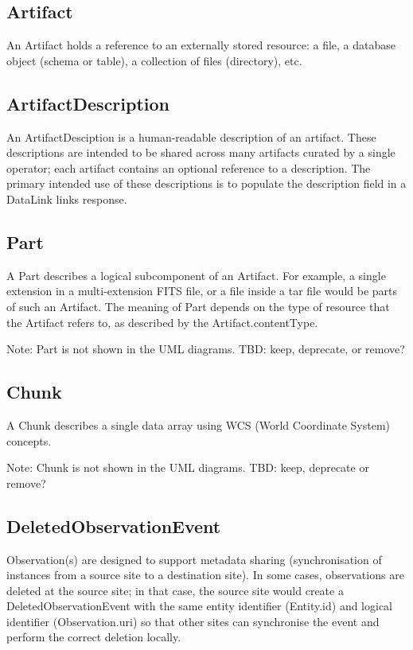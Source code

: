 \documentclass[11pt,a4paper]{ivoa}
\begin{document}
\subsection{Artifact}

An Artifact holds a reference to an externally stored resource: a file, a
database object (schema or table), a collection of files (directory), etc.

\subsection{ArtifactDescription}

An ArtifactDesciption is a human-readable description of an artifact. These
descriptions are intended to be shared across many artifacts curated by a single
operator; each artifact contains an optional reference to a description. The
primary intended use of these descriptions is to populate the description field
in a DataLink links response.

\subsection{Part}

A Part describes a logical subcomponent of an Artifact. For example, a single 
extension in a multi-extension FITS file, or a file inside a tar file would be parts
of such an Artifact. The meaning of Part depends on the type of resource that the
Artifact refers to, as described by the Artifact.contentType.

Note: Part is not shown in the UML diagrams. TBD: keep, deprecate, or remove?

\subsection{Chunk}

A Chunk describes a single data array using WCS (World Coordinate System) concepts. 

Note: Chunk is not shown in the UML diagrams. TBD: keep, deprecate or remove?

\subsection{DeletedObservationEvent}

Observation(s) are designed to support metadata sharing (synchronisation of instances
from a source site to a destination site). In some cases, observations are deleted at the 
source site; in that case, the source site would create a DeletedObservationEvent with the same 
entity identifier (Entity.id) and logical identifier (Observation.uri) so that other sites can
synchronise the event and perform the correct deletion locally.
\end{document}
